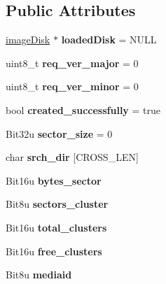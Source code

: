 \subsection*{Public Attributes}
\begin{DoxyCompactItemize}
\item 
\hypertarget{classfatDrive_a3a263d1b8a02f7aff910fe9ab2347b4f}{\hyperlink{classimageDisk}{image\-Disk} $\ast$ {\bfseries loaded\-Disk} = N\-U\-L\-L}\label{classfatDrive_a3a263d1b8a02f7aff910fe9ab2347b4f}

\item 
\hypertarget{classfatDrive_a4f049f1ebda6cfbab9eb2e8309ffeb26}{uint8\-\_\-t {\bfseries req\-\_\-ver\-\_\-major} = 0}\label{classfatDrive_a4f049f1ebda6cfbab9eb2e8309ffeb26}

\item 
\hypertarget{classfatDrive_aaf7c4859194288917a8fc5ece0c23c87}{uint8\-\_\-t {\bfseries req\-\_\-ver\-\_\-minor} = 0}\label{classfatDrive_aaf7c4859194288917a8fc5ece0c23c87}

\item 
\hypertarget{classfatDrive_ae3927936196f98009856fc9f46f1065a}{bool {\bfseries created\-\_\-successfully} = true}\label{classfatDrive_ae3927936196f98009856fc9f46f1065a}

\item 
\hypertarget{classfatDrive_ac8107e7154b762ea45805c3eec97b3dd}{Bit32u {\bfseries sector\-\_\-size} = 0}\label{classfatDrive_ac8107e7154b762ea45805c3eec97b3dd}

\item 
\hypertarget{classfatDrive_a87c406b52e2ede2b0d6d19df26e66184}{char {\bfseries srch\-\_\-dir} \mbox{[}C\-R\-O\-S\-S\-\_\-\-L\-E\-N\mbox{]}}\label{classfatDrive_a87c406b52e2ede2b0d6d19df26e66184}

\item 
\hypertarget{classfatDrive_a342b82338d182099e1de415a2296ee53}{Bit16u {\bfseries bytes\-\_\-sector}}\label{classfatDrive_a342b82338d182099e1de415a2296ee53}

\item 
\hypertarget{classfatDrive_aaba7c7638ee28c29d91ef7cf656f4e5c}{Bit8u {\bfseries sectors\-\_\-cluster}}\label{classfatDrive_aaba7c7638ee28c29d91ef7cf656f4e5c}

\item 
\hypertarget{classfatDrive_a85eca1f2d4a5e13fc25435b01eea3b64}{Bit16u {\bfseries total\-\_\-clusters}}\label{classfatDrive_a85eca1f2d4a5e13fc25435b01eea3b64}

\item 
\hypertarget{classfatDrive_a3da9f308f747d9e0682c032474594de9}{Bit16u {\bfseries free\-\_\-clusters}}\label{classfatDrive_a3da9f308f747d9e0682c032474594de9}

\item 
\hypertarget{classfatDrive_a44fa7ae4eff20a4f7391c131ef713746}{Bit8u {\bfseries mediaid}}\label{classfatDrive_a44fa7ae4eff20a4f7391c131ef713746}

\end{DoxyCompactItemize}
